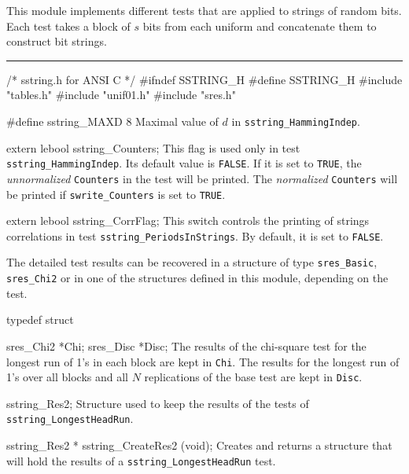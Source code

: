 
This module implements different tests that are applied to
strings of random bits.   Each test takes a block of $s$ bits 
from each uniform and concatenate them to construct bit strings.
\resdef


\bigskip
\hrule
\code\hide
/* sstring.h for ANSI C */
#ifndef SSTRING_H
#define SSTRING_H
\endhide
#include "tables.h" 
#include "unif01.h"
#include "sres.h"
\endcode
\ifdetailed  %

\code


#define sstring_MAXD 8
\endcode
 \tab
 Maximal value of $d$ in {\tt sstring\_HammingIndep}.   
 \endtab
\code


extern lebool sstring_Counters;
\endcode
 \tab
   This flag is used only in test {\tt sstring\_HammingIndep}.
   Its default value is {\tt FALSE}.
   If it is set to {\tt TRUE}, the {\it unnormalized} {\tt Counters} in
   the test will be printed. The {\it normalized} {\tt Counters} 
   will be printed if   {\tt swrite\_Counters} is set to  {\tt TRUE}.
 \endtab
\code


extern lebool sstring_CorrFlag;
\endcode
 \tab 
  This switch controls the printing of strings correlations
  in test {\tt sstring\_PeriodsInStrings}. By default, it is set to
  {\tt FALSE}.
 \endtab




The detailed test results can be recovered in a structure of type
{\tt sres\_Basic}, {\tt sres\_Chi2} or in one of the structures
defined in this module, depending on the test.

\code

typedef struct {

   sres_Chi2 *Chi;
   sres_Disc *Disc;
\endcode
 \tabb
  The results of the chi-square test for the longest run of 1's in each
  block are kept in {\tt Chi}.  The results for the longest run of 1's 
  over all blocks and all $N$ replications of the base test are kept in
  {\tt Disc}.
 \endtabb
\code

} sstring_Res2;
\endcode
 \tab
  Structure used to keep the results of the tests of
  {\tt sstring\_LongestHeadRun}.
 \endtab
\code


sstring_Res2 * sstring_CreateRes2 (void);
\endcode
 \tab 
  Creates and returns a structure that will hold the results
  of a  {\tt sstring\_LongestHeadRun} test. 
 \endtab
\code



